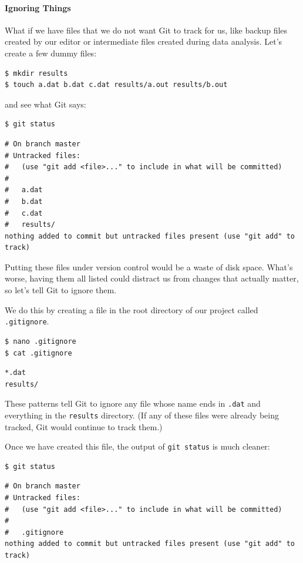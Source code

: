 \documentclass{book}
\begin{document}
\mbox{}\paragraph{Ignoring Things}

What if we have files that we do not want Git to track for us, like
backup files created by our editor or intermediate files created during
data analysis. Let's create a few dummy files:

\begin{verbatim}
$ mkdir results
$ touch a.dat b.dat c.dat results/a.out results/b.out
\end{verbatim}

and see what Git says:

\begin{verbatim}
$ git status
\end{verbatim}

\begin{verbatim}
# On branch master
# Untracked files:
#   (use "git add <file>..." to include in what will be committed)
#
#   a.dat
#   b.dat
#   c.dat
#   results/
nothing added to commit but untracked files present (use "git add" to track)
\end{verbatim}

Putting these files under version control would be a waste of disk
space. What's worse, having them all listed could distract us from
changes that actually matter, so let's tell Git to ignore them.

We do this by creating a file in the root directory of our project
called \texttt{.gitignore}.

\begin{verbatim}
$ nano .gitignore
$ cat .gitignore
\end{verbatim}

\begin{verbatim}
*.dat
results/
\end{verbatim}

These patterns tell Git to ignore any file whose name ends in
\texttt{.dat} and everything in the \texttt{results} directory. (If any
of these files were already being tracked, Git would continue to track
them.)

Once we have created this file, the output of \texttt{git status} is
much cleaner:

\begin{verbatim}
$ git status
\end{verbatim}

\begin{verbatim}
# On branch master
# Untracked files:
#   (use "git add <file>..." to include in what will be committed)
#
#   .gitignore
nothing added to commit but untracked files present (use "git add" to track)
\end{verbatim}
\end{document}
